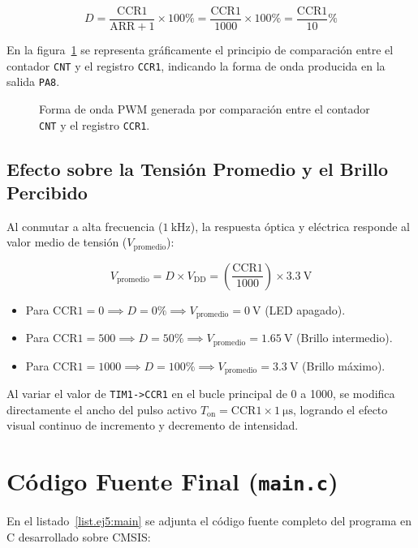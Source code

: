 \begin{equation}
    D = \frac{\text{CCR1}}{\text{ARR} + 1} \times 100\% = \frac{\text{CCR1}}{1000} \times 100\% = \frac{\text{CCR1}}{10}\%
    \label{eq.ej5:duty_cycle}
\end{equation}

En la figura~\ref{fig.ej5:pwm_plot} se representa gráficamente el principio de comparación entre el contador \texttt{CNT} y
el registro \texttt{CCR1}, indicando la forma de onda producida en la salida \texttt{PA8}.

\begin{figure}[!ht]
  \centering
  
  \caption{Forma de onda PWM generada por comparación entre el contador \texttt{CNT} y el registro \texttt{CCR1}.}
  \label{fig.ej5:pwm_plot}
\end{figure}

\subsection{Efecto sobre la Tensión Promedio y el Brillo Percibido}
Al conmutar a alta frecuencia ($\qty{1}{\kHz}$), la respuesta óptica y eléctrica responde al valor medio de tensión ($V_{\mathrm{promedio}}$):

\begin{equation}
    V_{\mathrm{promedio}} = D \times V_{\mathrm{DD}} = \left( \frac{\text{CCR1}}{1000} \right) \times \qty{3.3}{\V}
    \label{eq.ej5:v_promedio}
\end{equation}

\begin{itemize}
    \item Para $\text{CCR1} = 0 \implies D = 0\% \implies V_{\mathrm{promedio}} = \qty{0}{\V}$ (LED apagado).
    \item Para $\text{CCR1} = 500 \implies D = 50\% \implies V_{\mathrm{promedio}} = \qty{1.65}{\V}$ (Brillo intermedio).
    \item Para $\text{CCR1} = 1000 \implies D = 100\% \implies V_{\mathrm{promedio}} = \qty{3.3}{\V}$ (Brillo máximo).
\end{itemize}

Al variar el valor de \lstinline{TIM1->CCR1} en el bucle principal de 0 a 1000, se modifica directamente el ancho del pulso activo
$T_{\mathrm{on}} = \text{CCR1} \times \qty{1}{\us}$, logrando el efecto visual continuo de incremento y decremento de intensidad.

\section{Código Fuente Final (\texttt{main.c})}
\label{sec.ej5:codigo_fuente}

En el listado~\ref{list.ej5:main} se adjunta el código fuente completo del programa en C desarrollado sobre CMSIS:



